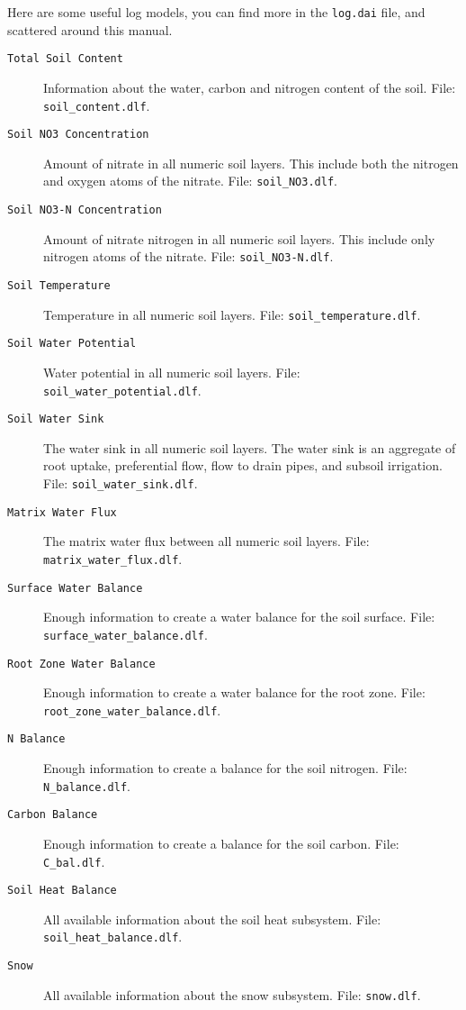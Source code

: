 \documentclass[a4paper,11pt]{article}
\begin{document}
Here are some useful log models, you can find more in the
\texttt{log.dai} file, and scattered around this manual.
\begin{description}
\item[\texttt{Total Soil Content}] Information about the water, carbon
  and nitrogen content of the soil.  File: \texttt{soil\_content.dlf}.
\item[\texttt{Soil NO3 Concentration}] Amount of nitrate in all
  numeric soil layers.  This include both the nitrogen and oxygen
  atoms of the nitrate.  File: \texttt{soil\_NO3.dlf}.
\item[\texttt{Soil NO3-N Concentration}] Amount of nitrate nitrogen in
  all numeric soil layers.  This include only nitrogen atoms of the
  nitrate.  File: \texttt{soil\_NO3-N.dlf}.
\item[\texttt{Soil Temperature}] Temperature in all numeric soil
  layers. File: \texttt{soil\_temperature.dlf}.
\item[\texttt{Soil Water Potential}] Water potential in all numeric
  soil layers.  File: \texttt{soil\_water\_potential.dlf}.
\item[\texttt{Soil Water Sink}] The water sink in all numeric soil
  layers.  The water sink is an aggregate of root uptake, preferential
  flow, flow to drain pipes, and subsoil irrigation.  File:
  \texttt{soil\_water\_sink.dlf}.
\item[\texttt{Matrix Water Flux}] The matrix water flux between all
  numeric soil layers.  File: \texttt{matrix\_water\_flux.dlf}.
\item[\texttt{Surface Water Balance}] Enough information to create a
  water balance for the soil surface.  File:
  \texttt{surface\_water\_balance.dlf}.
\item[\texttt{Root Zone Water Balance}] Enough information to create a
  water balance for the root zone.  File:
  \texttt{root\_zone\_water\_balance.dlf}. 
\item[\texttt{N Balance}] Enough information to create a balance for
  the soil nitrogen.  File: \texttt{N\_balance.dlf}.
\item[\texttt{Carbon Balance}] Enough information to create a balance for
  the soil carbon.  File: \texttt{C\_bal.dlf}.
\item[\texttt{Soil Heat Balance}] All available information about the
  soil heat subsystem.  File: \texttt{soil\_heat\_balance.dlf}.
\item[\texttt{Snow}] All available information about the snow
  subsystem.  File: \texttt{snow.dlf}.
\end{description}
\end{document}
